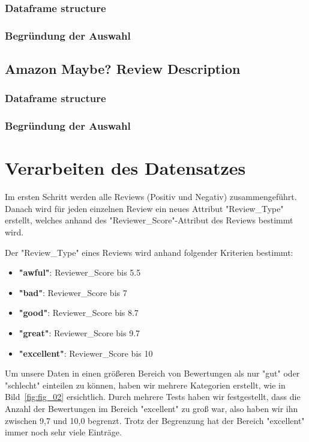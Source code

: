 \subsubsection*{Dataframe structure}
\subsubsection*{Begründung der Auswahl}

\subsection{Amazon Maybe? Review Description}
\subsubsection*{Dataframe structure}
\subsubsection*{Begründung der Auswahl}
\newpage
\section{Verarbeiten des Datensatzes}

Im ersten Schritt werden alle Reviews (Positiv und Negativ) zusammengeführt.\\
Danach wird für jeden einzelnen Review ein neues Attribut "Review\_Type" erstellt, welches anhand des "Reviewer\_Score"-Attribut des Reviews bestimmt wird.

Der "Review\_Type" eines Reviews wird anhand folgender Kriterien bestimmt:

\begin{itemize}
\item \textbf{"awful"}: Reviewer\_Score bis 5.5
\item \textbf{"bad"}: Reviewer\_Score bis 7
\item \textbf{"good"}: Reviewer\_Score bis 8.7
\item \textbf{"great"}: Reviewer\_Score bis 9.7
\item \textbf{"excellent"}: Reviewer\_Score bis 10
\end{itemize}

Um unsere Daten in einen größeren Bereich von Bewertungen als nur "gut" oder "schlecht" einteilen zu können, haben wir mehrere Kategorien erstellt, wie in Bild~\ref{fig:fig_02} ersichtlich. Durch mehrere Tests haben wir festgestellt, dass die Anzahl der Bewertungen im Bereich "excellent" zu groß war, also haben wir ihn zwischen 9,7 und 10,0 begrenzt. Trotz der Begrenzung hat der Bereich "excellent" immer noch sehr viele Einträge.

